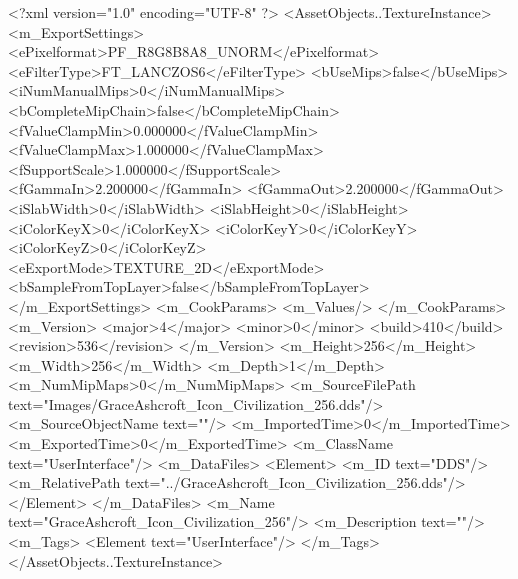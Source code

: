 <?xml version="1.0" encoding="UTF-8" ?>
<AssetObjects..TextureInstance>
	<m_ExportSettings>
		<ePixelformat>PF_R8G8B8A8_UNORM</ePixelformat>
		<eFilterType>FT_LANCZOS6</eFilterType>
		<bUseMips>false</bUseMips>
		<iNumManualMips>0</iNumManualMips>
		<bCompleteMipChain>false</bCompleteMipChain>
		<fValueClampMin>0.000000</fValueClampMin>
		<fValueClampMax>1.000000</fValueClampMax>
		<fSupportScale>1.000000</fSupportScale>
		<fGammaIn>2.200000</fGammaIn>
		<fGammaOut>2.200000</fGammaOut>
		<iSlabWidth>0</iSlabWidth>
		<iSlabHeight>0</iSlabHeight>
		<iColorKeyX>0</iColorKeyX>
		<iColorKeyY>0</iColorKeyY>
		<iColorKeyZ>0</iColorKeyZ>
		<eExportMode>TEXTURE_2D</eExportMode>
		<bSampleFromTopLayer>false</bSampleFromTopLayer>
	</m_ExportSettings>
	<m_CookParams>
		<m_Values/>
	</m_CookParams>
	<m_Version>
		<major>4</major>
		<minor>0</minor>
		<build>410</build>
		<revision>536</revision>
	</m_Version>
	<m_Height>256</m_Height>
	<m_Width>256</m_Width>
	<m_Depth>1</m_Depth>
	<m_NumMipMaps>0</m_NumMipMaps>
	<m_SourceFilePath text="Images/GraceAshcroft_Icon_Civilization_256.dds"/>
	<m_SourceObjectName text=""/>
	<m_ImportedTime>0</m_ImportedTime>
	<m_ExportedTime>0</m_ExportedTime>
	<m_ClassName text="UserInterface"/>
	<m_DataFiles>
		<Element>
			<m_ID text="DDS"/>
			<m_RelativePath text="../GraceAshcroft_Icon_Civilization_256.dds"/>
		</Element>
	</m_DataFiles>
	<m_Name text="GraceAshcroft_Icon_Civilization_256"/>
	<m_Description text=""/>
	<m_Tags>
		<Element text="UserInterface"/>
	</m_Tags>
</AssetObjects..TextureInstance>
